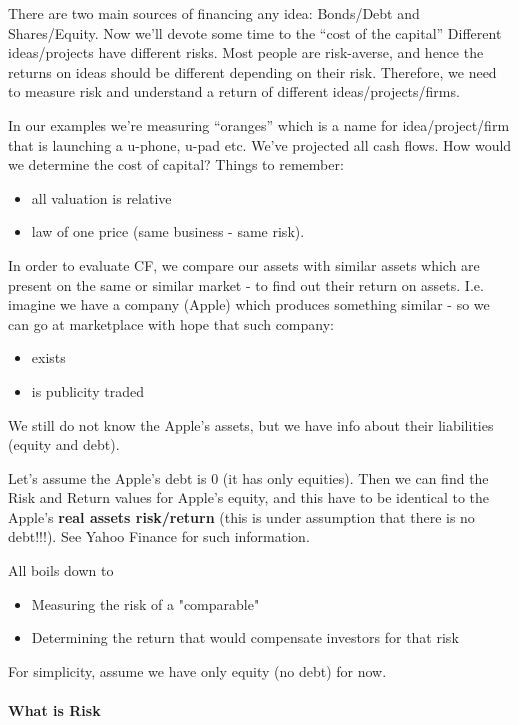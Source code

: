 \documentclass{scrartcl}
\begin{document}
There are two main sources of financing any idea: Bonds/Debt and Shares/Equity.
Now we'll devote some time to the ``cost of the capital'' Different
ideas/projects have different risks. Most people are risk-averse, and hence the
returns on ideas should be different depending on their risk. Therefore, we need
to measure risk and understand a return of different ideas/projects/firms.

In our examples we're measuring ``oranges'' which is a name for
idea/project/firm that is launching a u-phone, u-pad etc. We've projected all
cash flows. How would we determine the cost of capital? Things to remember:
\begin{itemize}
\item all valuation is relative
\item law of one price (same business - same risk).
\end{itemize}

In order to evaluate CF, we compare our assets with similar assets which are
present on the same or similar market - to find out their return on assets. I.e.
imagine we have a company (Apple) which produces something similar - so we can
go at marketplace with hope that such company:
\begin{itemize}
\item exists
\item is publicity traded
\end{itemize}
We still do not know the Apple's assets, but we have info about their
liabilities (equity and debt).

Let's assume the Apple's debt is 0 (it has only equities). Then we can find the
Risk and Return values for Apple's equity, and this have to be identical to the
Apple's {\bf real assets risk/return} (this is under assumption that there is no
debt!!!). See Yahoo Finance for such information.

All boils down to
\begin{itemize}
\item Measuring the risk of a "comparable"
\item Determining the return that would compensate investors for that risk
\end{itemize}
For simplicity, assume we have only equity (no debt) for now.

\paragraph{What is Risk}
\end{document}
